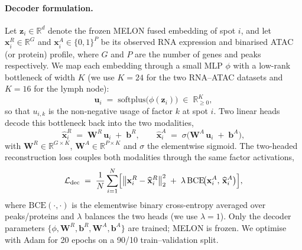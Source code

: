 \documentclass{article}
\theoremstyle{plain}
\theoremstyle{definition}
\begin{document}
\paragraph{Decoder formulation.}
Let $\mathbf{z}_i \in \mathbb{R}^{d}$ denote the frozen MELON fused embedding of spot $i$, and let $\mathbf{x}^{R}_i \in \mathbb{R}^{G}$ and $\mathbf{x}^{A}_i \in \{0,1\}^{P}$ be its observed RNA expression and binarised ATAC (or protein) profile, where $G$ and $P$ are the number of genes and peaks respectively. We map each embedding through a small MLP $\phi$ with a low-rank bottleneck of width $K$ (we use $K{=}24$ for the two RNA--ATAC datasets and $K{=}16$ for the lymph node):
\begin{equation}\label{eq:decoder-bottleneck}
    \mathbf{u}_i \;=\; \mathrm{softplus}\!\bigl(\phi(\mathbf{z}_i)\bigr) \;\in\; \mathbb{R}_{\geq 0}^{K},
\end{equation}
so that $u_{i,k}$ is the non-negative usage of factor $k$ at spot $i$. Two linear heads decode this bottleneck back into the two modalities,
\begin{equation}\label{eq:decoder-heads}
    \widehat{\mathbf{x}}^{R}_i \;=\; \mathbf{W}^{R}\,\mathbf{u}_i \;+\; \mathbf{b}^{R},
    \qquad
    \widehat{\mathbf{x}}^{A}_i \;=\; \sigma\!\bigl(\mathbf{W}^{A}\,\mathbf{u}_i \;+\; \mathbf{b}^{A}\bigr),
\end{equation}
with $\mathbf{W}^{R} \in \mathbb{R}^{G \times K}$, $\mathbf{W}^{A} \in \mathbb{R}^{P \times K}$ and $\sigma$ the elementwise sigmoid. The two-headed reconstruction loss couples both modalities through the same factor activations,
\begin{equation}\label{eq:decoder-loss}
    \mathcal{L}_{\text{dec}}
    \;=\; \frac{1}{N}\sum_{i=1}^{N}\Bigl[
        \bigl\|\mathbf{x}^{R}_i - \widehat{\mathbf{x}}^{R}_i\bigr\|_{2}^{2}
        \;+\; \lambda\,
        \mathrm{BCE}\!\bigl(\mathbf{x}^{A}_i,\,\widehat{\mathbf{x}}^{A}_i\bigr)
    \Bigr],
\end{equation}
where $\mathrm{BCE}(\cdot,\cdot)$ is the elementwise binary cross-entropy averaged over peaks/proteins and $\lambda$ balances the two heads (we use $\lambda{=}1$). Only the decoder parameters $\{\phi, \mathbf{W}^{R}, \mathbf{b}^{R}, \mathbf{W}^{A}, \mathbf{b}^{A}\}$ are trained; MELON is frozen. We optimise with Adam for 20 epochs on a 90/10 train--validation split.
\end{document}
